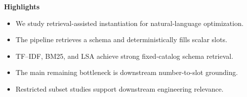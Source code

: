 \documentclass[12pt]{article}
\begin{document}
\noindent\textbf{Highlights}
\begin{itemize}
    \item We study retrieval-assisted instantiation for natural-language optimization.
    \item The pipeline retrieves a schema and deterministically fills scalar slots.
    \item TF--IDF, BM25, and LSA achieve strong fixed-catalog schema retrieval.
    \item The main remaining bottleneck is downstream number-to-slot grounding.
    \item Restricted subset studies support downstream engineering relevance.
\end{itemize}
\end{document}
